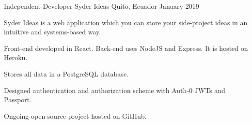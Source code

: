 
\begin{cventries}

    
  \cventry
    {Independent Developer}
    {Syder Ideas}
    {Quito, Ecuador}
    {January 2019}
    {
      \begin{cvitems}
        \item {Syder Ideas is a web application which you can store your side-project ideas in an intuitive and systems-based way.}
        \item {Front-end developed in React. Back-end uses NodeJS and Express. It is hosted on Heroku.}
        \item {Stores all data in a PostgreSQL database.}
        \item {Designed authentication and authorization scheme with Auth-0 JWTs and Passport.}
        \item {Ongoing open source project hosted on GitHub.}
      \end{cvitems}
    }
        
\end{cventries}
